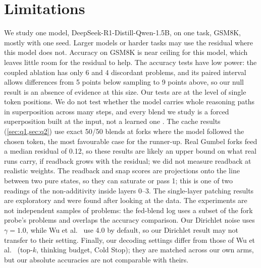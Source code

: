 \section{Limitations}\label{sec:limitations}

We study one model, DeepSeek-R1-Distill-Qwen-1.5B, on one task, GSM8K, mostly with one seed. %
Larger models or harder tasks may use the residual where this model does not.
Accuracy on GSM8K is near ceiling for this model, which leaves little room for the residual to help.
The accuracy tests have low power: the coupled ablation has only 6 and 4 discordant problems, and its paired %
interval allows differences from 5 points below sampling to 9 points above, so our null result is an absence of %
evidence at this size.
Our tests are at the level of single token positions.
We do not test whether the model carries whole reasoning paths in superposition across many steps, and every blend
we study is a forced superposition built at the input, not a learned one \cite{rizvimartel2026illusion}.
The cache results (\cref{sec:q1,sec:q2}) use exact 50/50 blends at forks where the model followed the chosen
token, the most favourable case for the runner-up.
Real Gumbel forks feed a median residual of 0.12, so these results are likely an upper bound on what real runs carry, %
if readback grows with the residual; we did not measure readback at realistic weights.
The readback and snap scores are projections onto the line between two pure states, so they can saturate or pass 1;
this is one of two readings of the non-additivity inside layers 0--3. %
The single-layer patching results are exploratory and were found after looking at the data.
The experiments are not independent samples of problems: the fed-blend log uses a subset of the fork probe's
problems and overlaps the accuracy comparison.
Our Dirichlet noise uses $\gamma = 1.0$, %
while Wu et al.~\cite{wu2025single} use 4.0 by default, so our Dirichlet result may not transfer to their setting. %
Finally, our decoding settings differ from those of Wu et al.~\cite{wu2025single} (top-$k$, thinking budget, Cold Stop); they
are matched across our own arms, but our absolute accuracies are not comparable with theirs.
